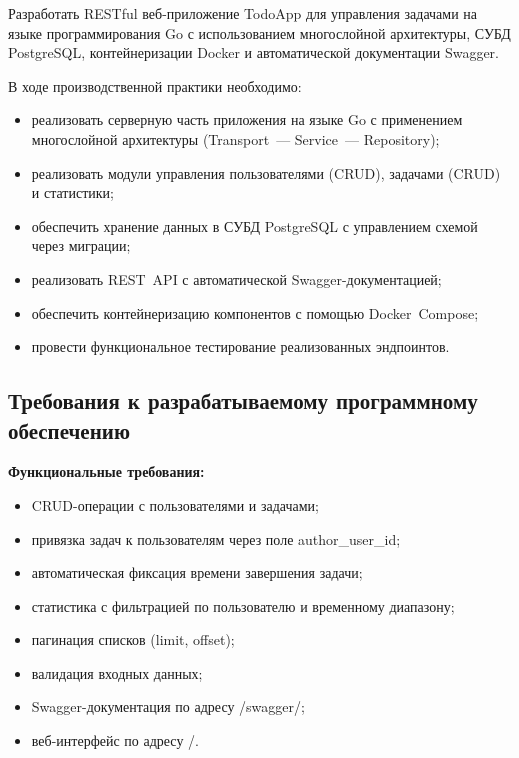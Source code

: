 \documentclass[a4paper,14pt]{extarticle}
\begin{document}
Разработать RESTful веб-приложение TodoApp для управления задачами на языке программирования Go с использованием многослойной архитектуры, СУБД PostgreSQL, контейнеризации Docker и автоматической документации Swagger.

В ходе производственной практики необходимо:
\begin{itemize}[leftmargin=1.25cm, itemsep=0pt]
  \item[---] реализовать серверную часть приложения на языке Go с применением многослойной архитектуры (Transport~--- Service~--- Repository);
  \item[---] реализовать модули управления пользователями (CRUD), задачами (CRUD) и статистики;
  \item[---] обеспечить хранение данных в СУБД PostgreSQL с управлением схемой через миграции;
  \item[---] реализовать REST~API с автоматической Swagger-документацией;
  \item[---] обеспечить контейнеризацию компонентов с помощью Docker~Compose;
  \item[---] провести функциональное тестирование реализованных эндпоинтов.
\end{itemize}

\subsection*{Требования к разрабатываемому программному обеспечению}

\textbf{Функциональные требования:}
\begin{itemize}[leftmargin=1.25cm, itemsep=0pt]
  \item[---] CRUD-операции с пользователями и задачами;
  \item[---] привязка задач к пользователям через поле author\_user\_id;
  \item[---] автоматическая фиксация времени завершения задачи;
  \item[---] статистика с фильтрацией по пользователю и временному диапазону;
  \item[---] пагинация списков (limit, offset);
  \item[---] валидация входных данных;
  \item[---] Swagger-документация по адресу /swagger/;
  \item[---] веб-интерфейс по адресу /.
\end{itemize}
\end{document}
